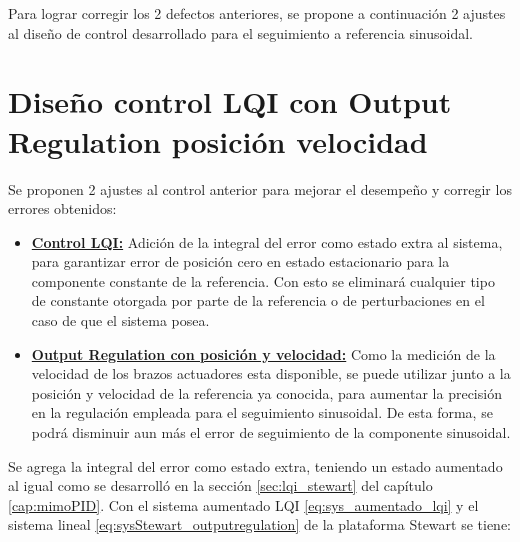 Para lograr corregir los 2 defectos anteriores, se propone a continuación 2 ajustes al diseño de control desarrollado para el seguimiento a referencia sinusoidal. 




 \section{Diseño control LQI con Output Regulation posición velocidad}

Se proponen 2 ajustes al control anterior para mejorar el desempeño y corregir los errores obtenidos:
\begin{itemize}
    \item \textbf{\underline{Control LQI:}} Adición de la integral del error como estado extra al sistema, para garantizar error de posición cero en estado estacionario para la componente constante de la referencia. Con esto se eliminará cualquier tipo de constante otorgada por parte de la referencia o de perturbaciones en el caso de que el sistema posea.

    \item \textbf{\underline{Output Regulation con posición y velocidad:}} Como la medición de la velocidad de los brazos actuadores esta disponible, se puede utilizar junto a la posición y velocidad de la referencia ya conocida, para aumentar la precisión en la regulación empleada para el seguimiento sinusoidal. De esta forma, se podrá disminuir aun más el error de seguimiento de la componente sinusoidal.
\end{itemize}

Se agrega la integral del error como estado extra, teniendo un estado aumentado al igual como se desarrolló en la sección \ref{sec:lqi_stewart} del capítulo \ref{cap:mimoPID}. Con el sistema aumentado LQI \ref{eq:sys_aumentado_lqi} y el sistema lineal \ref{eq:sysStewart_outputregulation} de la plataforma Stewart se tiene:

